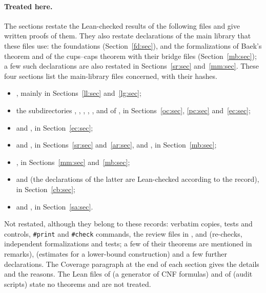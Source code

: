 \documentclass[10pt]{amsart}
\begin{document}
\paragraph{Treated here.}
The sections restate the Lean-checked results of the following files and give written proofs of them. They also
restate declarations of the main library  that these files use: the foundations
(Section~\ref{fd:sec}), and the formalizations of Baek's theorem and of the cups--caps theorem with their bridge files
(Section~\ref{mb:sec}); a few such declarations are also restated in Sections~\ref{sr:sec} and~\ref{mm:sec}. These
four sections list the main-library files concerned, with their hashes.
\begin{itemize}
\item {}, mainly in Sections~\ref{ll:sec} and~\ref{lg:sec};
\item the subdirectories , , , , ,  and
   of , in Sections~\ref{oc:sec}, \ref{pc:sec} and~\ref{ec:sec};
\item {} and , in Section~\ref{ec:sec};
\item {} and , in Sections~\ref{sr:sec}
  and~\ref{ar:sec}, and , in Section~\ref{mb:sec};
\item {}, in Sections~\ref{mm:sec} and~\ref{mb:sec};
\item {} and  (the declarations of the latter are Lean-checked according to the record), in
  Section~\ref{cb:sec};
\item {} and , in Section~\ref{sa:sec}.
\end{itemize}
Not restated, although they belong to these records: verbatim copies, tests and controls, \texttt{\#print} and
\texttt{\#check} commands, the review files in ,  and
 (re-checks, independent formalizations and tests; a few of their theorems are mentioned in
remarks),  (estimates for a lower-bound construction) and a few further
declarations. The Coverage paragraph at the end of each section gives the details and the reasons. The Lean files of
 (a generator of CNF formulas) and of  (audit scripts) state no theorems and are not treated.
\end{document}
